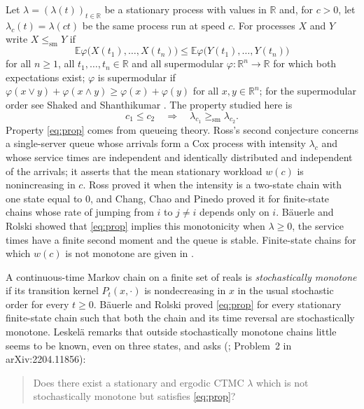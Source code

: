 \documentclass[11pt]{amsart}
\theoremstyle{remark}
\numberwithin{equation}{section}
\newcommand{\E}{\mathbb E}
\newcommand{\R}{\mathbb R}
\newcommand{\1}{\mathbf 1}
\newcommand{\sm}{\mathrm{sm}}
\begin{document}
Let $\lambda=(\lambda(t))_{t\in\R}$ be a stationary process with values in $\R$ and, for $c>0$, let $\lambda_c(t)=\lambda(ct)$ be the same process run at speed $c$. For processes $X$ and $Y$ write $X\le_\sm Y$ if
\[
\E\varphi\bigl(X(t_1),\dots,X(t_n)\bigr)\le\E\varphi\bigl(Y(t_1),\dots,Y(t_n)\bigr)
\]
for all $n\ge1$, all $t_1,\dots,t_n\in\R$ and all supermodular $\varphi\colon\R^n\to\R$ for which both expectations exist; $\varphi$ is supermodular if $\varphi(x\vee y)+\varphi(x\wedge y)\ge\varphi(x)+\varphi(y)$ for all $x,y\in\R^n$; for the supermodular order see Shaked and Shanthikumar \cite{SS07}. The property studied here is
\begin{equation}\label{eq:prop}
c_1\le c_2\quad\Longrightarrow\quad\lambda_{c_1}\ge_\sm\lambda_{c_2}.
\end{equation}
Property \eqref{eq:prop} comes from queueing theory. Ross's second conjecture \cite{Ros} concerns a single-server queue whose arrivals form a Cox process with intensity $\lambda_c$ and whose service times are independent and identically distributed and independent of the arrivals; it asserts that the mean stationary workload $w(c)$ is nonincreasing in $c$. Ross \cite{Ros} proved it when the intensity is a two-state chain with one state equal to $0$, and Chang, Chao and Pinedo \cite{CCP} proved it for finite-state chains whose rate of jumping from $i$ to $j\ne i$ depends only on $i$. B\"auerle and Rolski \cite{BR} showed that \eqref{eq:prop} implies this monotonicity when $\lambda\ge0$, the service times have a finite second moment and the queue is stable. Finite-state chains for which $w(c)$ is not monotone are given in \cite{Shm}.

A continuous-time Markov chain on a finite set of reals is \emph{stochastically monotone} if its transition kernel $P_t(x,\cdot)$ is nondecreasing in $x$ in the usual stochastic order for every $t\ge0$. B\"auerle and Rolski \cite{BR} proved \eqref{eq:prop} for every stationary finite-state chain such that both the chain and its time reversal are stochastically monotone. Leskel\"a \cite{Les} remarks that outside stochastically monotone chains little seems to be known, even on three states, and asks (\cite[Problem~3]{Les}; Problem~2 in arXiv:2204.11856):

\begin{quote}
Does there exist a stationary and ergodic CTMC $\lambda$ which is not stochastically monotone but satisfies \eqref{eq:prop}?
\end{quote}
\end{document}

